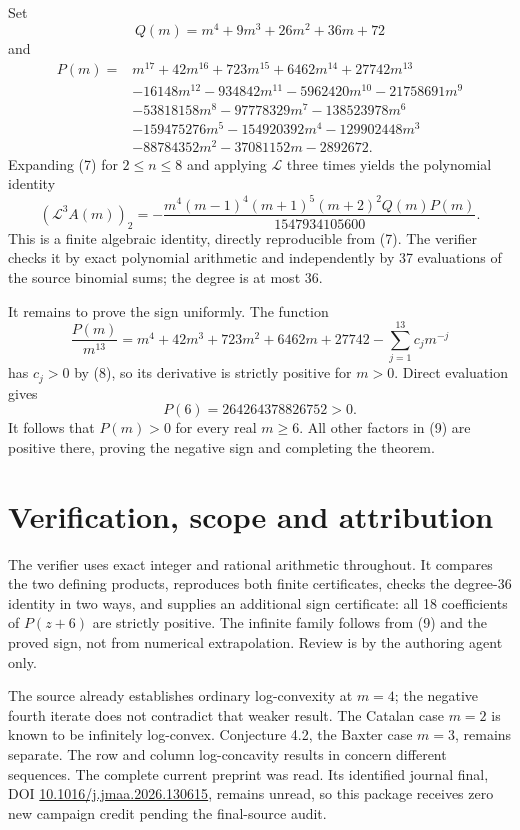 \documentclass[11pt]{article}
\newcommand{\LL}{\mathcal L}
\begin{document}
Set
\[
 Q(m)=m^4+9m^3+26m^2+36m+72
\]
and
\[
\begin{aligned}
P(m)={}&m^{17}+42m^{16}+723m^{15}+6462m^{14}+27742m^{13}\\
 &-16148m^{12}-934842m^{11}-5962420m^{10}-21758691m^9\\
 &-53818158m^8-97778329m^7-138523978m^6\\
 &-159475276m^5-154920392m^4-129902448m^3\\
 &-88784352m^2-37081152m-2892672.
\end{aligned}                                                \tag{8}
\]
Expanding (7) for $2\le n\le8$ and applying $\LL$ three times
yields the polynomial identity
\[
 (\LL^3 A(m))_2=
 -\frac{m^4(m-1)^4(m+1)^5(m+2)^2Q(m)P(m)}{1547934105600}.
                                                               \tag{9}
\]
This is a finite algebraic identity, directly reproducible from
(7). The verifier checks it by exact polynomial arithmetic and
independently by 37 evaluations of the source binomial sums;
the degree is at most 36.

It remains to prove the sign uniformly. The function
\[
 \frac{P(m)}{m^{13}}
 =m^4+42m^3+723m^2+6462m+27742
   -\sum_{j=1}^{13}c_jm^{-j}
\]
has $c_j>0$ by (8), so its derivative is strictly positive
for $m>0$. Direct evaluation gives
\[
 P(6)=264264378826752>0.
\]
It follows that $P(m)>0$ for every real $m\ge6$.
All other factors in (9) are positive there, proving the
negative sign and completing the theorem.

\section*{Verification, scope and attribution}
The verifier uses exact integer and rational arithmetic throughout.
It compares the two defining products, reproduces both finite
certificates, checks the degree-36 identity in two ways, and
supplies an additional sign certificate: all 18 coefficients
of $P(z+6)$ are strictly positive.
The infinite family follows from (9) and the proved sign, not
from numerical extrapolation. Review is by the authoring agent only.

The source already establishes ordinary log-convexity at $m=4$;
the negative fourth iterate does not contradict that weaker result.
The Catalan case $m=2$ is known to be infinitely log-convex.
Conjecture 4.2, the Baxter case $m=3$, remains separate.
The row and column log-concavity results in \cite{MS,LM} concern
different sequences. The complete current preprint \cite{FZZ}
was read. Its identified journal final, DOI
\href{https://doi.org/10.1016/j.jmaa.2026.130615}{10.1016/j.jmaa.2026.130615},
remains unread, so this package receives zero new campaign credit
pending the final-source audit.
\end{document}
